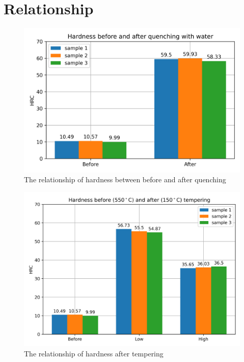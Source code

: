 \section{Relationship}
\begin{figure}[ht]
	\centering
	\includegraphics[width=150mm]{Hardness.png}
	\caption{The relationship of hardness between before and after quenching}
\end{figure}
\begin{figure}[ht]
	\centering
	\includegraphics[width=150mm]{Hardness2.png}
	\caption{The relationship of hardness after tempering}
	\label{label}
\end{figure}
